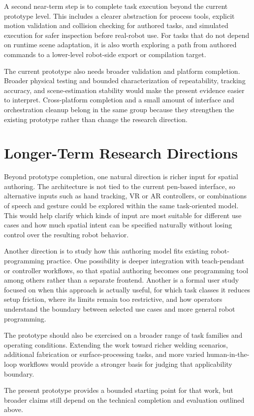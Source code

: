A second near-term step is to complete task execution beyond the current prototype level. This includes a clearer abstraction for process tools, explicit motion validation and collision checking for authored tasks, and simulated execution for safer inspection before real-robot use. For tasks that do not depend on runtime scene adaptation, it is also worth exploring a path from authored commands to a lower-level robot-side export or compilation target.

The current prototype also needs broader validation and platform completion. Broader physical testing and bounded characterization of repeatability, tracking accuracy, and scene-estimation stability would make the present evidence easier to interpret. Cross-platform completion and a small amount of interface and orchestration cleanup belong in the same group because they strengthen the existing prototype rather than change the research direction.

\section{Longer-Term Research Directions}

Beyond prototype completion, one natural direction is richer input for spatial authoring. The architecture is not tied to the current pen-based interface, so alternative inputs such as hand tracking, VR or AR controllers, or combinations of speech and gesture could be explored within the same task-oriented model. This would help clarify which kinds of input are most suitable for different use cases and how much spatial intent can be specified naturally without losing control over the resulting robot behavior.

Another direction is to study how this authoring model fits existing robot-programming practice. One possibility is deeper integration with teach-pendant or controller workflows, so that spatial authoring becomes one programming tool among others rather than a separate frontend. Another is a formal user study focused on when this approach is actually useful, for which task classes it reduces setup friction, where its limits remain too restrictive, and how operators understand the boundary between selected use cases and more general robot programming.

The prototype should also be exercised on a broader range of task families and operating conditions. Extending the work toward richer welding scenarios, additional fabrication or surface-processing tasks, and more varied human-in-the-loop workflows would provide a stronger basis for judging that applicability boundary.

The present prototype provides a bounded starting point for that work, but broader claims still depend on the technical completion and evaluation outlined above.
